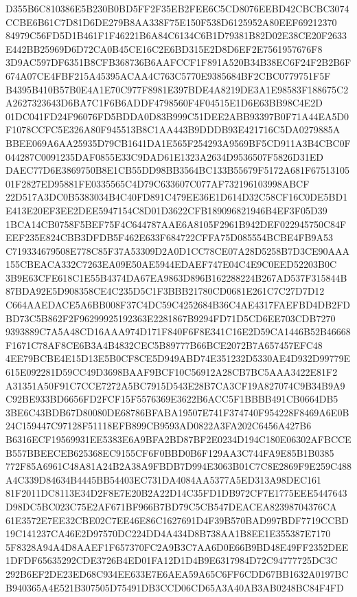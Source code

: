 \documentclass[UTF8,fontset=fandol,zihao=-4,a4paper]{ctexart}
\begin{document}
{{D355B6C810386E5B230B0BD5FF2F35EB2FEE6C5CD8076EEBD42CBCBC3074CCBE6B61C7D81D6DE279B8AA338F75E150F538D6125952A80EEF69212370
84979C56FD5D1B461F1F46221B6A84C6134C6B1D79381B82D02E38CE20F2633E442BB25969D6D72CA0B45CE16C2E6BD315E2D8D6EF2E7561957676F8
3D9AC597DF6351B8CFB368736B6AAFCCF1F891A520B34B38EC6F24F2B2B6F674A07CE4FBF215A45395ACAA4C763C5770E9385684BF2CBC0779751F5F
B4395B410B57B0E4A1E70C977F8981E397BDE4A8219DE3A1E98583F188675C2A2627323643D6BA7C1F6B6ADDF4798560F4F04515E1D6E63BB98C4E2D
01DC041FD24F96076FD5BDDA0D83B999C51DEE2ABB93397B0F71A44EA5D0F1078CCFC5E326A80F945513B8C1AA443B9DDDB93E421716C5DA0279885A
BBEE069A6AA25935D79CB1641DA1E565F254293A9569BF5CD911A3B4CBC0F044287C0091235DAF0855E33C9DAD61E1323A2634D9536507F5826D31ED
DAEC77D6E3869750B8E1CB55DD98BB3564BC133B55679F5172A681F6751310501F2827ED95881FE0335565C4D79C633607C077AF732196103998ABCF
22D517A3DC0B5383034B4C40FD891C479EE36E1D614D32C58CF16C0DE5BD1E413E20EF3EE2DEE5947154C8D01D3622CFB189096821946B4EF3F05D39
1BCA14CB0758F5BEF75F4C644787AAE6A8105F2961B942DEF022945750C84FEEF235E824CBB3DFDB5F462E633F684722CFFA75D085554BCBE4FB9A53
C719334679508E778C85F37A53309D2A0D1CC78CE07A28D5258B7D3CE90AAA155CBEACA332C7263EA09E50AE5944EDAEF747E04C4E9C0EED52203B0C
3B9E63CFE618C1E55B4374DA67EA9863D896B162288224B267AD537F315844B87BDA92E5D908358CE4C235D5C1F3BBB21780CD0681E261C7C27D7D12
C664AAEDACE5A6BB008F37C4DC59C4252684B36C4AE4317FAEFBD4DB2FDBD73C5B862F2F96299925192363E2281867B9294FD71D5CD6EE703CDB7270
9393889C7A5A48CD16AAA974D171F840F6F8E341C16E2D59CA1446B52B46668F1671C78AF8CE6B3A4B4832CEC5B89777B66BCE2072B7A657457EFC48
4EE79BCBE4E15D13E5B0CF8CE5D949ABD74E351232D5330AE4D932D99779E615E092281D59CC49D3698BAAF9BCF10C56912A28CB7BC5AAA3422E81F2
A31351A50F91C7CCE7272A5BC7915D543E28B7CA3CF19A827074C9B34B9A9C92BE933BD6656FD2FCF15F5576369E3622B6ACC5F1BBBB491CB0664DB5
3BE6C43BDB67D80080DE68786BFABA19507E741F374740F954228F8469A6E0B24C159447C97128F51118EFB899CB9593AD0822A3FA202C6456A427B6
B6316ECF19569931EE5383E6A9BFA2BD87BF2E0234D194C180E06302AFBCCEB557BBEECEB625368EC9155CF6F0BBD0B6F129AA3C744FA9E85B1B0385
772F85A6961C48A81A24B2A38A9FBDB7D994E3063B01C7C8E2869F9E259C488A4C339D84634B4445BB54403EC731DA4084AA5377A5ED313A98DEC161
81F2011DC8113E34D2F8E7E20B2A22D14C35FD1DB972CF7E1775EEE5447643D98DC5BC023C75E2AF671BF966B7BD79C5CB547DEACEA82398704376CA
61E3572E7EE32CBE02C7EE46E86C1627691D4F39B570BAD997BDF7719CCBD19C141237CA46E2D97570DC224DD4A434D8B738AA1B8EE1E355387E7170
5F8328A94A4D8AAEF1F657370FC2A9B3C7AA6D0E66B9BD48E49FF2352DEE1DFDF65635292CDE3726B4ED01FA12D1D4B9E6317984D72C94777725DC3C
292B6EF2DE23ED68C934EE633E7E6AEA59A65C6FF6CDD67BB1632A0197BCB940365A4E521B307505D75491DB3CCD06CD65A3A40AB3AB0248BC84F4FD
}}
\end{document}
